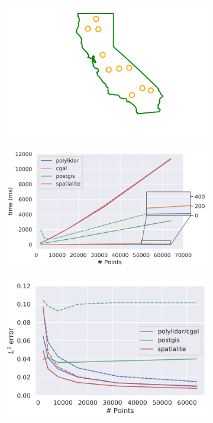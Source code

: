 \begin{figure}[ht]
    \centering
  \begin{subfigure}[t]{.28\linewidth}
    \centering
    \includegraphics[clip, trim=1.5cm 0cm 1.5cm 0cm, width=0.99\linewidth]{chapter_2_polylidar/imgs/caholes.pdf}
    \caption{}
    \label{fig:ch2_ca_holes}
  \end{subfigure}
  \begin{subfigure}[t]{.36\linewidth}
    \centering
     \includegraphics[width=.99\linewidth]{chapter_2_polylidar/imgs/compare_algs_time_inset_ca.pdf}
    \caption{}
    \label{fig:ch2_ca_tim}
  \end{subfigure}
  \begin{subfigure}[t]{.33\linewidth}
    \centering
    \includegraphics[width=.99\linewidth]{chapter_2_polylidar/imgs/compare_algs_accuracy_ca-min.pdf}

\end{subfigure}
\end{figure}
